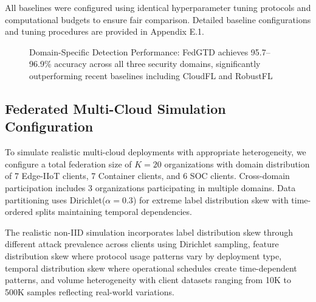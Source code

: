 \documentclass[12pt,a4paper]{article}
\theoremstyle{definition}
\begin{document}
All baselines were configured using identical hyperparameter tuning protocols and computational budgets to ensure fair comparison. Detailed baseline configurations and tuning procedures are provided in Appendix E.1.

\begin{figure}[H]
\centering
{}
\caption{Domain-Specific Detection Performance: FedGTD achieves 95.7--96.9\% accuracy across all three security domains, significantly outperforming recent baselines including CloudFL and RobustFL}
\label{fig:domain_performance}
\end{figure}

\subsection{Federated Multi-Cloud Simulation Configuration}

To simulate realistic multi-cloud deployments with appropriate heterogeneity, we configure a total federation size of $K = 20$ organizations with domain distribution of 7 Edge-IIoT clients, 7 Container clients, and 6 SOC clients. Cross-domain participation includes 3 organizations participating in multiple domains. Data partitioning uses Dirichlet($\alpha = 0.3$) for extreme label distribution skew \cite{li2020federated} with time-ordered splits maintaining temporal dependencies.

The realistic non-IID simulation incorporates label distribution skew through different attack prevalence across clients using Dirichlet sampling, feature distribution skew where protocol usage patterns vary by deployment type, temporal distribution skew where operational schedules create time-dependent patterns, and volume heterogeneity with client datasets ranging from 10K to 500K samples reflecting real-world variations.
\end{document}
